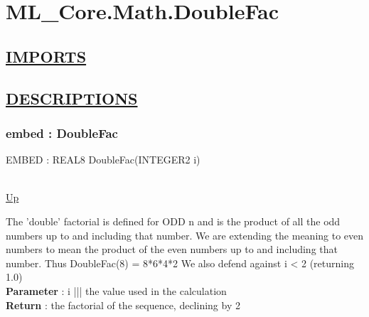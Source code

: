\chapter*{ML\_Core.Math.DoubleFac}
\hypertarget{ML_Core.Math.DoubleFac}{}

\section*{\underline{IMPORTS}}

\section*{\underline{DESCRIPTIONS}}
\subsection*{embed : DoubleFac}
\hypertarget{ecldoc:ml_core.math.doublefac}{EMBED : REAL8 DoubleFac(INTEGER2 i)} \\
\hyperlink{ecldoc:}{Up} \\
\par
The 'double' factorial is defined for ODD n and is the product of all the odd numbers up to and including that number. We are extending the meaning to even numbers to mean the product of the even numbers up to and including that number. Thus DoubleFac(8) = 8*6*4*2 We also defend against i < 2 (returning 1.0) \\
\textbf{Parameter} : i ||| the value used in the calculation \\
\textbf{Return} : the factorial of the sequence, declining by 2 \\
